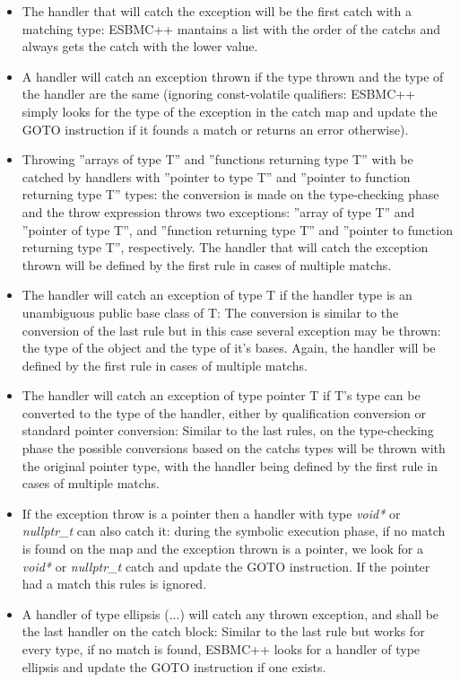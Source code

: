 \documentclass[a4paper]{llncs}
\begin{document}
\begin{itemize}
 \item The handler that will catch the exception will be the first catch with a matching type: ESBMC++ mantains a list with the order of
       the catchs and always gets the catch with the lower value.
 \item A handler will catch an exception thrown if the type thrown and the type of the handler are the same (ignoring const-volatile
       qualifiers: ESBMC++ simply looks for the type of the exception in the catch map and update the GOTO instruction if it founds a 
       match or returns an error otherwise).
 \item Throwing ''arrays of type T'' and ''functions returning type T'' with be catched by handlers with ''pointer to type T'' and 
       ''pointer to function returning type T'' types: the conversion is made on the type-checking phase and the throw expression throws 
       two exceptions: ''array of type T'' and ''pointer of type T'', and ''function returning type T'' and ''pointer to function returning 
       type T'', respectively. The handler that will catch the exception thrown will be defined by the first rule in cases of multiple
       matchs.
 \item The handler will catch an exception of type T if the handler type is an unambiguous public base class of T: The conversion is similar
       to the conversion of the last rule but in this case several exception may be thrown: the type of the object and the type of it's 
       bases. Again, the handler will be defined by the first rule in cases of multiple matchs.
 \item The handler will catch an exception of type pointer T if T's type can be converted to the type of the handler, either by 
       qualification conversion or standard pointer conversion: Similar to the last rules, on the type-checking phase the possible 
       conversions based on the catchs types will be thrown with the original pointer type, with the handler being defined by the first rule
       in cases of multiple matchs.
 \item If the exception throw is a pointer then a handler with type \textit{void*} or \textit{nullptr\_t} can also catch it: during the symbolic execution phase, if no match is found on the map and the exception thrown is a pointer, we look for a \textit{void*} or \textit{nullptr\_t} catch and update the GOTO instruction. If the pointer had a match this rules is ignored.
 \item A handler of type ellipsis (...) will catch any thrown exception, and shall be the last handler on the catch block: Similar to the 
       last rule but works for every type, if no match is found, ESBMC++ looks for a handler of type ellipsis and update the GOTO 
       instruction if one exists.
\end{itemize}
\end{document}
